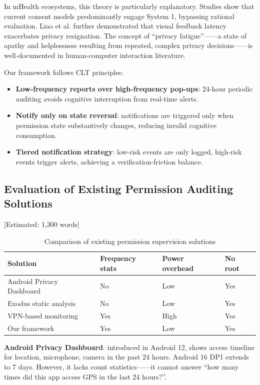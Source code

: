 In mHealth ecosystems, this theory is particularly explanatory. Studies show that current consent models predominantly engage System 1, bypassing rational evaluation. Liao et al. further demonstrated that visual feedback latency exacerbates privacy resignation. The concept of ``privacy fatigue''——a state of apathy and helplessness resulting from repeated, complex privacy decisions——is well-documented in human-computer interaction literature.

Our framework follows CLT principles:
\begin{itemize}
\item \textbf{Low-frequency reports over high-frequency pop-ups}: 24-hour periodic auditing avoids cognitive interruption from real-time alerts.
\item \textbf{Notify only on state reversal}: notifications are triggered only when permission state substantively changes, reducing invalid cognitive consumption.
\item \textbf{Tiered notification strategy}: low-risk events are only logged, high-risk events trigger alerts, achieving a verification-friction balance.
\end{itemize}

\subsection{Evaluation of Existing Permission Auditing Solutions} [Estimated: 1,300 words]
\begin{table}[H]
\centering
\caption{Comparison of existing permission supervision solutions}
\begin{tabular}{p{3cm}p{2.5cm}p{2.5cm}p{2.5cm}}
\toprule
\textbf{Solution} & \textbf{Frequency stats} & \textbf{Power overhead} & \textbf{No root} \\
\midrule
Android Privacy Dashboard & No & Low & Yes \\
Exodus static analysis & No & Low & Yes \\
VPN-based monitoring & Yes & High & Yes \\
Our framework & Yes & Low & Yes \\
\bottomrule
\end{tabular}
\end{table}

\textbf{Android Privacy Dashboard}: introduced in Android 12, shows access timeline for location, microphone, camera in the past 24 hours. Android 16 DP1 extends to 7 days. However, it lacks count statistics——it cannot answer ``how many times did this app access GPS in the last 24 hours?''.

